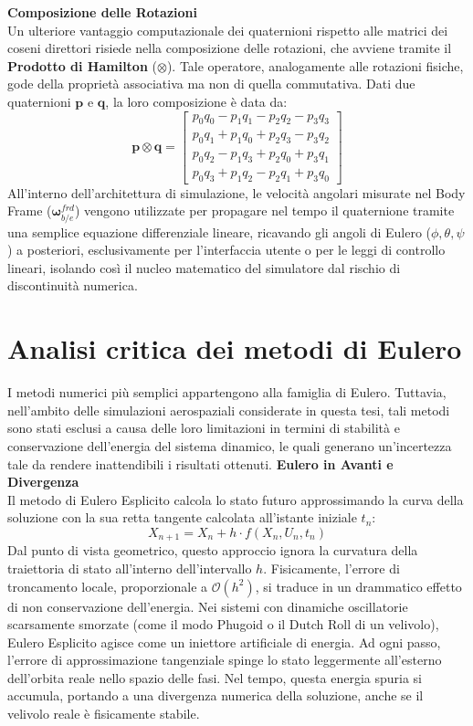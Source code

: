 \textbf{Composizione delle Rotazioni}\\
Un ulteriore vantaggio computazionale dei quaternioni rispetto alle matrici dei coseni direttori risiede nella composizione delle rotazioni, che avviene tramite il \textbf{Prodotto di Hamilton} ($\otimes$). Tale operatore, analogamente alle rotazioni fisiche, gode della proprietà associativa ma non di quella commutativa. Dati due quaternioni $\mathbf{p}$ e $\mathbf{q}$, la loro composizione è data da:
\begin{equation}
	\mathbf{p} \otimes \mathbf{q} = 
	\begin{bmatrix}
		p_0 q_0 - p_1 q_1 - p_2 q_2 - p_3 q_3 \\
		p_0 q_1 + p_1 q_0 + p_2 q_3 - p_3 q_2 \\
		p_0 q_2 - p_1 q_3 + p_2 q_0 + p_3 q_1 \\
		p_0 q_3 + p_1 q_2 - p_2 q_1 + p_3 q_0
	\end{bmatrix}
\end{equation}
All'interno dell'architettura di simulazione, le velocità angolari misurate nel Body Frame ($\boldsymbol{\omega}_{b/e}^{frd}$) vengono utilizzate per propagare nel tempo il quaternione tramite una semplice equazione differenziale lineare, ricavando gli angoli di Eulero ($\phi, \theta, \psi$) a posteriori, esclusivamente per l'interfaccia utente o per le leggi di controllo lineari, isolando così il nucleo matematico del simulatore dal rischio di discontinuità numerica.

\section{Analisi critica dei metodi di Eulero}
\label{cap4.6}
I metodi numerici più semplici appartengono alla famiglia di Eulero. Tuttavia, nell'ambito delle simulazioni aerospaziali considerate in questa tesi, tali metodi sono stati esclusi a causa delle loro limitazioni in termini di stabilità e conservazione dell’energia del sistema dinamico, le quali generano un’incertezza tale da rendere inattendibili i risultati ottenuti. \textbf{Eulero in Avanti e Divergenza}\\ Il metodo di Eulero Esplicito calcola lo stato futuro approssimando la curva della soluzione con la sua retta tangente calcolata all'istante iniziale $t_n$:
\begin{equation}
X_{n+1} = X_n + h \cdot f(X_n, U_n, t_n)
\end{equation}
Dal punto di vista geometrico, questo approccio ignora la curvatura della traiettoria di stato all'interno dell'intervallo $h$. Fisicamente, l'errore di troncamento locale, proporzionale a $\mathcal{O}(h^2)$, si traduce in un drammatico effetto di non conservazione dell'energia. Nei sistemi con dinamiche oscillatorie scarsamente smorzate (come il modo Phugoid o il Dutch Roll di un velivolo), Eulero Esplicito agisce come un iniettore artificiale di energia. Ad ogni passo, l'errore di approssimazione tangenziale spinge lo stato leggermente all'esterno dell'orbita reale nello spazio delle fasi. Nel tempo, questa energia spuria si accumula, portando a una divergenza numerica della soluzione, anche se il velivolo reale è fisicamente stabile.

